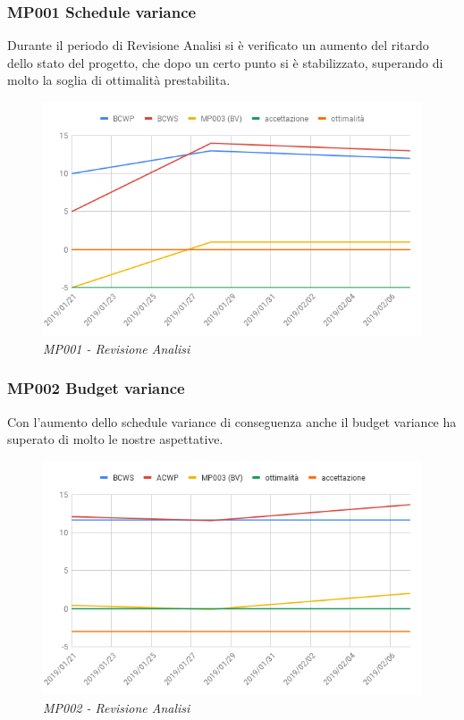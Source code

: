 \subsubsection{MP001 Schedule variance}
Durante il periodo di Revisione Analisi si è verificato un aumento del ritardo dello stato del progetto, che dopo un certo punto si è stabilizzato, superando di molto la soglia di ottimalità prestabilita.
\begin{figure} [H]
    \centering
	\includegraphics[scale=0.5]{./images/svRa.png}
	\caption{\textit{MP001 - Revisione Analisi}}\label{}
\end{figure}

\subsubsection{MP002 Budget variance}
Con l'aumento dello schedule variance di conseguenza anche il budget variance ha superato di molto le nostre aspettative.
\begin{figure} [H]
    \centering
	\includegraphics[scale=0.5]{./images/bvra.png}
	\caption{\textit{MP002 - Revisione Analisi}}\label{}
\end{figure}


